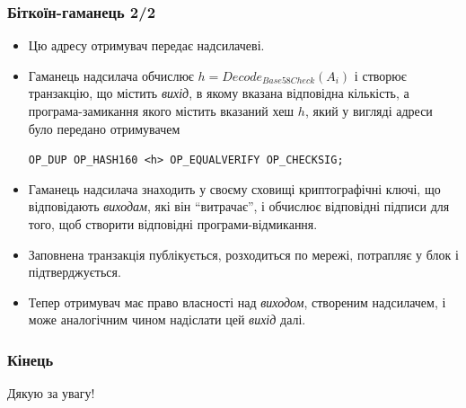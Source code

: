 \documentclass{beamer}
\begin{document}
\begin{frame}[fragile]
  \frametitle{Біткоїн-гаманець 2/2}
  \begin{itemize}
  \item Цю адресу отримувач передає надсилачеві.
  \item Гаманець надсилача обчислює $h = Decode_{Base58Check}(A_i)$ і створює
    транзакцію, що містить \textit{вихід}, в якому вказана відповідна кількість,
    а програма-замикання якого містить вказаний хеш $h$, який у вигляді адреси
    було передано отримувачем
    \begin{center}
      \tiny\texttt{OP_DUP OP_HASH160 <h> OP_EQUALVERIFY OP_CHECKSIG;}
    \end{center}
  \item Гаманець надсилача знаходить у своєму сховищі криптографічні
    ключі, що відповідають \textit{виходам}, які він ``витрачає'', і обчислює
    відповідні підписи для того, щоб створити відповідні програми-відмикання.
  \item Заповнена транзакція публікується, розходиться по мережі, потрапляє у
    блок і підтверджується.
  \item Тепер отримувач має право власності над \textit{виходом}, створеним
    надсилачем, і може аналогічним чином надіслати цей \textit{вихід} далі.
  \end{itemize}
\end{frame}

\begin{frame}
  \frametitle{Кінець}
  \begin{center}
    Дякую за увагу!
  \end{center}
\end{frame}
\end{document}
